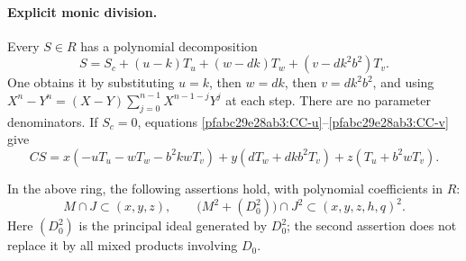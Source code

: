 \paragraph{Explicit monic division.}
Every $S\in R$ has a polynomial decomposition
\[
 S=S_c+(u-k)T_u+(w-dk)T_w+(v-dk^2b^2)T_v.                 \tag{CC1}
\]
One obtains it by substituting $u=k$, then $w=dk$, then $v=dk^2b^2$,
and using $X^n-Y^n=(X-Y)\sum_{j=0}^{n-1}X^{n-1-j}Y^j$ at each step.
There are no parameter denominators. If $S_c=0$, equations
\eqref{pfabc29e28ab3:CC-u}--\eqref{pfabc29e28ab3:CC-v} give
\[
 CS=x(-uT_u-wT_w-b^2kwT_v)
     +y(dT_w+dkb^2T_v)+z(T_u+b^2wT_v).                 \tag{CC2}
\]

\begin{lemma}
In the above ring, the following assertions hold, with polynomial
coefficients in $R$:
\[
 M\cap J\subset (x,y,z),\qquad
 \bigl(M^2+(D_0^2)\bigr)\cap J^2
       \subset (x,y,z,h,q)^2.                         \tag{CC3}
\]
Here $(D_0^2)$ is the principal ideal generated by $D_0^2$; the second
assertion does not replace it by all mixed products involving $D_0$.
\end{lemma}
